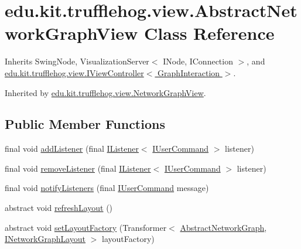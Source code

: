 \hypertarget{classedu_1_1kit_1_1trufflehog_1_1view_1_1_abstract_network_graph_view}{}\section{edu.\+kit.\+trufflehog.\+view.\+Abstract\+Network\+Graph\+View Class Reference}
\label{classedu_1_1kit_1_1trufflehog_1_1view_1_1_abstract_network_graph_view}


Inherits Swing\+Node, Visualization\+Server$<$ I\+Node, I\+Connection $>$, and \hyperlink{interfaceedu_1_1kit_1_1trufflehog_1_1view_1_1_i_view_controller}{edu.\+kit.\+trufflehog.\+view.\+I\+View\+Controller$<$ Graph\+Interaction $>$}.



Inherited by \hyperlink{classedu_1_1kit_1_1trufflehog_1_1view_1_1_network_graph_view}{edu.\+kit.\+trufflehog.\+view.\+Network\+Graph\+View}.

\subsection*{Public Member Functions}
\begin{DoxyCompactItemize}
\item 
final void \hyperlink{classedu_1_1kit_1_1trufflehog_1_1view_1_1_abstract_network_graph_view_a5955db1e8dc1f5d087fc755d55dae56d}{add\+Listener} (final \hyperlink{interfaceedu_1_1kit_1_1trufflehog_1_1util_1_1_i_listener}{I\+Listener}$<$ \hyperlink{interfaceedu_1_1kit_1_1trufflehog_1_1command_1_1usercommand_1_1_i_user_command}{I\+User\+Command} $>$ listener)
\item 
final void \hyperlink{classedu_1_1kit_1_1trufflehog_1_1view_1_1_abstract_network_graph_view_a77b3fa0abcb7c26eddee549b00dd86d4}{remove\+Listener} (final \hyperlink{interfaceedu_1_1kit_1_1trufflehog_1_1util_1_1_i_listener}{I\+Listener}$<$ \hyperlink{interfaceedu_1_1kit_1_1trufflehog_1_1command_1_1usercommand_1_1_i_user_command}{I\+User\+Command} $>$ listener)
\item 
final void \hyperlink{classedu_1_1kit_1_1trufflehog_1_1view_1_1_abstract_network_graph_view_a5771cd41862d721f3d30bc9b8c3b7201}{notify\+Listeners} (final \hyperlink{interfaceedu_1_1kit_1_1trufflehog_1_1command_1_1usercommand_1_1_i_user_command}{I\+User\+Command} message)
\item 
abstract void \hyperlink{classedu_1_1kit_1_1trufflehog_1_1view_1_1_abstract_network_graph_view_a507f17318b519b7e2ff327a7bce27efa}{refresh\+Layout} ()
\item 
abstract void \hyperlink{classedu_1_1kit_1_1trufflehog_1_1view_1_1_abstract_network_graph_view_a0ee9f5abd55c6e049cd02a1ae9306f9a}{set\+Layout\+Factory} (Transformer$<$ \hyperlink{classedu_1_1kit_1_1trufflehog_1_1model_1_1graph_1_1_abstract_network_graph}{Abstract\+Network\+Graph}, \hyperlink{interfaceedu_1_1kit_1_1trufflehog_1_1model_1_1graph_1_1_i_network_graph_layout}{I\+Network\+Graph\+Layout} $>$ layout\+Factory)
\end{DoxyCompactItemize}


